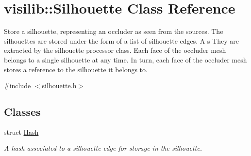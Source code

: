 \hypertarget{classvisilib_1_1_silhouette}{}\section{visilib\+::Silhouette Class Reference}
\label{classvisilib_1_1_silhouette}


Store a silhouette, representing an occluder as seen from the sources. The silhouettes are stored under the form of a list of silhouette edges. A s They are extracted by the silhouette processor class. Each face of the occluder mesh belongs to a single silhouette at any time. In turn, each face of the occluder mesh stores a reference to the silhouette it belongs to.  




{\ttfamily \#include $<$silhouette.\+h$>$}

\subsection*{Classes}
\begin{DoxyCompactItemize}
\item 
struct \mbox{\hyperlink{structvisilib_1_1_silhouette_1_1_hash}{Hash}}
\begin{DoxyCompactList}\small\item\em A hash associated to a silhouette edge for storage in the silhouette. \end{DoxyCompactList}\end{DoxyCompactItemize}
